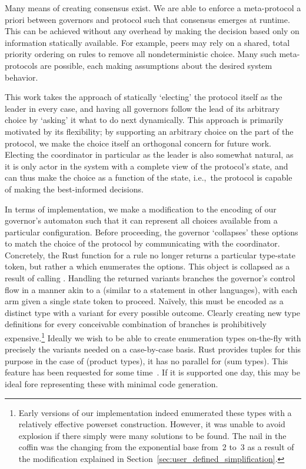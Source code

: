 Many means of creating consensus exist. We are able to enforce a meta-protocol a priori between governors and protocol such that consensus emerges at runtime. This can be achieved without any overhead by making the decision based only on information statically available. For example, peers may rely on a shared, total priority ordering on rules to remove all nondeterministic choice. Many such meta-protocols are possible, each making assumptions about the desired system behavior.

This work takes the approach of statically `electing' the protocol itself as the leader in every case, and having all governors follow the lead of its arbitrary choice by `asking' it what to do next dynamically. This approach is primarily motivated by its flexibility; by supporting an arbitrary choice on the part of the protocol, we make the choice itself an orthogonal concern for future work. Electing the coordinator in particular as the leader is also somewhat natural, as it is only actor in the system with a complete view of the protocol's state, and can thus make the choice as a function of the state, i.e.,\ the protocol is capable of making the best-informed decisions.

In terms of implementation, we make a modification to the encoding of our governor's automaton such that it can represent all choices available from a particular configuration. Before proceeding, the governor `collapses' these options to match the choice of the protocol by communicating with the coordinator. Concretely, the Rust function for a rule no longer returns a particular type-state token, but rather a  which enumerates the options. This object is collapsed as a result of calling . Handling the returned variants branches the governor's control flow in a manner akin to a  (similar to a  statement in other languages), with each arm given a single state token to proceed. Na\"ively, this must be encoded as a distinct  type with a variant for every possible outcome. Clearly creating new type definitions for every conceivable combination of branches is prohibitively expensive.\footnote{Early versions of our implementation indeed enumerated these types with a relatively effective powerset construction. However, it was unable to avoid explosion if there simply were many solutions to be found. The nail in the coffin was the changing from the exponential base from~2 to~3 as a result of the modification explained in Section~\ref{sec:user_defined_simplification}.} Ideally we wish to be able to create enumeration types on-the-fly with precisely the variants needed on a case-by-case basis. Rust provides tuples for this purpose in the case of  (product types), it has no parallel for  (sum types). This feature has been requested for some time~\cite{anon_sum}. If it is supported one day, this may be ideal fore representing these  with minimal code generation. 

